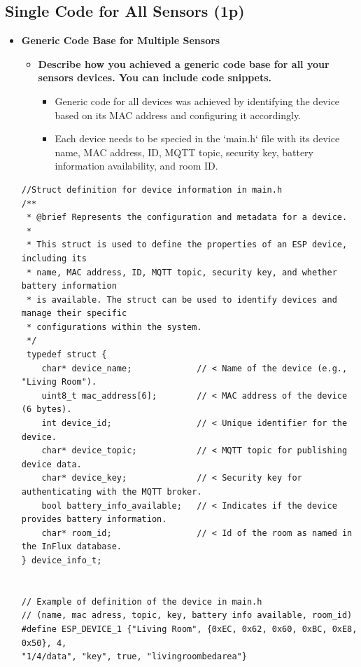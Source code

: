 \documentclass[A4,10pt]{article}
\begin{document}
\subsection{Single Code for All Sensors (1p)}

\begin{itemize}
    \item \textbf{Generic Code Base for Multiple Sensors}
    
    \begin{itemize}
		\item \textbf{Describe how you achieved a generic code base for all your sensors devices. You can include code snippets.}
		\begin{itemize}
			\item Generic code for all devices was achieved by identifying the device based on its MAC address and configuring it accordingly.
			\item Each device needs to be specied in the `main.h` file with its device name, MAC address, ID, MQTT topic, security key, battery information availability, and room ID.
		\end{itemize}
	\end{itemize}

	\begin{verbatim}
//Struct definition for device information in main.h
/**
 * @brief Represents the configuration and metadata for a device.
 *
 * This struct is used to define the properties of an ESP device, including its
 * name, MAC address, ID, MQTT topic, security key, and whether battery information
 * is available. The struct can be used to identify devices and manage their specific
 * configurations within the system.
 */
 typedef struct {
    char* device_name;             // < Name of the device (e.g., "Living Room").
    uint8_t mac_address[6];        // < MAC address of the device (6 bytes).
    int device_id;                 // < Unique identifier for the device.
    char* device_topic;            // < MQTT topic for publishing device data.
    char* device_key;              // < Security key for authenticating with the MQTT broker.
    bool battery_info_available;   // < Indicates if the device provides battery information.
    char* room_id;                 // < Id of the room as named in the InFlux database.
} device_info_t;


// Example of definition of the device in main.h
// (name, mac adress, topic, key, battery info available, room_id)
#define ESP_DEVICE_1 {"Living Room", {0xEC, 0x62, 0x60, 0xBC, 0xE8, 0x50}, 4, 
"1/4/data", "key", true, "livingroombedarea"}


\end{verbatim}
\end{itemize}
\end{document}
